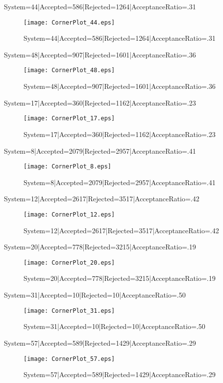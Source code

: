\documentclass[10pt]{article}
\begin{document}
System=44|Accepted=586|Rejected=1264|AcceptanceRatio=.31
\begin{figure}[h]
\texttt{[image: CornerPlot\_44.eps]}
\caption{System=44|Accepted=586|Rejected=1264|AcceptanceRatio=.31}
\label{S44}
\centering
\end{figure}

System=48|Accepted=907|Rejected=1601|AcceptanceRatio=.36
\begin{figure}[h]
\texttt{[image: CornerPlot\_48.eps]}
\caption{System=48|Accepted=907|Rejected=1601|AcceptanceRatio=.36}
\label{S48}
\centering
\end{figure}

System=17|Accepted=360|Rejected=1162|AcceptanceRatio=.23
\begin{figure}[h]
\texttt{[image: CornerPlot\_17.eps]}
\caption{System=17|Accepted=360|Rejected=1162|AcceptanceRatio=.23}
\label{S17}
\centering
\end{figure}

System=8|Accepted=2079|Rejected=2957|AcceptanceRatio=.41
\begin{figure}[h]
\texttt{[image: CornerPlot\_8.eps]}
\caption{System=8|Accepted=2079|Rejected=2957|AcceptanceRatio=.41}
\label{S8}
\centering
\end{figure}

System=12|Accepted=2617|Rejected=3517|AcceptanceRatio=.42
\begin{figure}[h]
\texttt{[image: CornerPlot\_12.eps]}
\caption{System=12|Accepted=2617|Rejected=3517|AcceptanceRatio=.42}
\label{S12}
\centering
\end{figure}

System=20|Accepted=778|Rejected=3215|AcceptanceRatio=.19
\begin{figure}[h]
\texttt{[image: CornerPlot\_20.eps]}
\caption{System=20|Accepted=778|Rejected=3215|AcceptanceRatio=.19}
\label{S20}
\centering
\end{figure}

System=31|Accepted=10|Rejected=10|AcceptanceRatio=.50
\begin{figure}[h]
\texttt{[image: CornerPlot\_31.eps]}
\caption{System=31|Accepted=10|Rejected=10|AcceptanceRatio=.50}
\label{S31}
\centering
\end{figure}

System=57|Accepted=589|Rejected=1429|AcceptanceRatio=.29
\begin{figure}[h]
\texttt{[image: CornerPlot\_57.eps]}
\caption{System=57|Accepted=589|Rejected=1429|AcceptanceRatio=.29}
\label{S57}
\centering
\end{figure}
\end{document}
